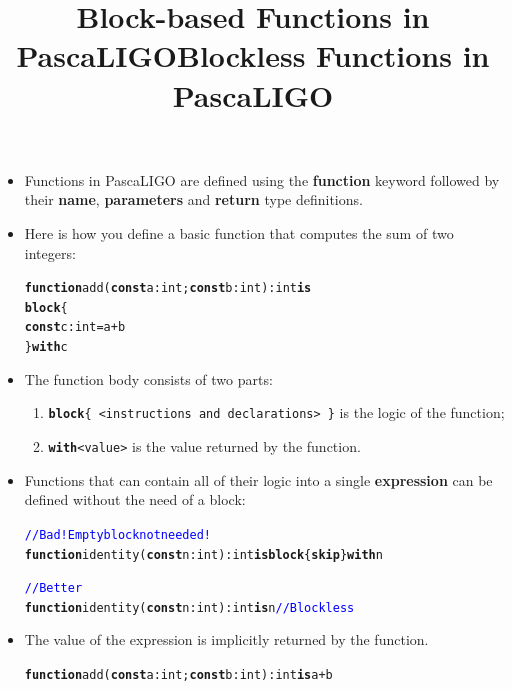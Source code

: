 \documentclass[wide]{slides}
\newcommand{\Kblock}[0]{\textbf{block}\xspace}
\newcommand{\Kconst}[0]{\textbf{const}\xspace}
\newcommand{\Kfunction}[0]{\textbf{function}\xspace}
\newcommand{\Kis}[0]{\textbf{is}\xspace}
\newcommand{\Kskip}[0]{\textbf{skip}\xspace}
\newcommand{\Kwith}[0]{\textbf{with}\xspace}
\newcommand{\com}[1]{\textcolor{blue}{{#1}}}
\begin{document}
\begin{slide}
  \title{Block-based Functions in PascaLIGO}

  \begin{itemize}

    \item Functions in PascaLIGO are defined using the \Kfunction
      keyword followed by their \textbf{name}, \textbf{parameters} and
      \textbf{return} type definitions.

    \item Here is how you define a basic function that computes the
      sum of two integers:
      \begin{alltt}
\Kfunction add (\Kconst a : int; \Kconst b : int) : int \Kis
  \Kblock \{
    \Kconst c : int = a + b
  \} \Kwith c
      \end{alltt}

  \item The function body consists of two parts:
    \begin{enumerate}

      \item \texttt{\Kblock \{ <instructions and declarations> \}} is
        the logic of the function;

      \item \texttt{\Kwith <value>} is the value returned by the
        function.

    \end{enumerate}

  \end{itemize}

\end{slide}


\begin{slide}
  \title{Blockless Functions in PascaLIGO}

  \begin{itemize}

    \item Functions that can contain all of their logic into a single
      \textbf{expression} can be defined without the need of a block:
      \begin{alltt}
\com{// Bad! Empty block not needed!}
\Kfunction identity (\Kconst n : int) : int \Kis \Kblock \{ \Kskip \} \Kwith n

\com{// Better}
\Kfunction identity (\Kconst n : int) : int \Kis n  \com{// Blockless}
      \end{alltt}

    \item The value of the expression is implicitly returned by the
      function.
      \begin{alltt}
\Kfunction add (\Kconst a: int; \Kconst b : int) : int \Kis a + b
      \end{alltt}

  \end{itemize}

\end{slide}
\end{document}
